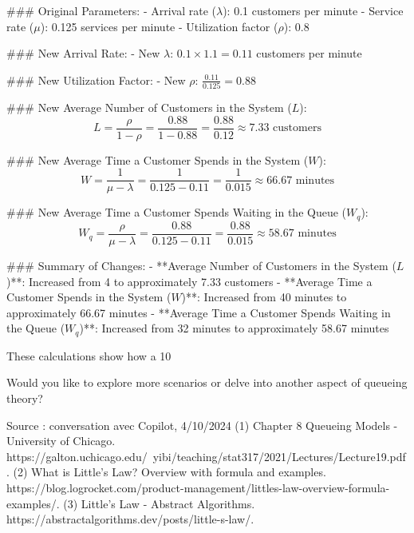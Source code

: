 \documentclass[a4paper12pt]{article}
\begin{document}
### Original Parameters:
- Arrival rate (\(\lambda\)): 0.1 customers per minute
- Service rate (\(\mu\)): 0.125 services per minute
- Utilization factor (\(\rho\)): 0.8

### New Arrival Rate:
- New \(\lambda\): \(0.1 \times 1.1 = 0.11\) customers per minute

### New Utilization Factor:
- New \(\rho\): \(\frac{0.11}{0.125} = 0.88\)

### New Average Number of Customers in the System (\(L\)):
$$L = \frac{\rho}{1 - \rho} = \frac{0.88}{1 - 0.88} = \frac{0.88}{0.12} \approx 7.33 \text{ customers}$$

### New Average Time a Customer Spends in the System (\(W\)):
$$W = \frac{1}{\mu - \lambda} = \frac{1}{0.125 - 0.11} = \frac{1}{0.015} \approx 66.67 \text{ minutes}$$

### New Average Time a Customer Spends Waiting in the Queue (\(W_q\)):
$$W_q = \frac{\rho}{\mu - \lambda} = \frac{0.88}{0.125 - 0.11} = \frac{0.88}{0.015} \approx 58.67 \text{ minutes}$$

### Summary of Changes:
- **Average Number of Customers in the System (\(L\))**: Increased from 4 to approximately 7.33 customers
- **Average Time a Customer Spends in the System (\(W\))**: Increased from 40 minutes to approximately 66.67 minutes
- **Average Time a Customer Spends Waiting in the Queue (\(W_q\))**: Increased from 32 minutes to approximately 58.67 minutes

These calculations show how a 10%

Would you like to explore more scenarios or delve into another aspect of queueing theory?

Source : conversation avec Copilot, 4/10/2024
(1) Chapter 8 Queueing Models - University of Chicago. https://galton.uchicago.edu/~yibi/teaching/stat317/2021/Lectures/Lecture19.pdf.
(2) What is Little’s Law? Overview with formula and examples. https://blog.logrocket.com/product-management/littles-law-overview-formula-examples/.
(3) Little's Law - Abstract Algorithms. https://abstractalgorithms.dev/posts/little-s-law/.
\end{document}
